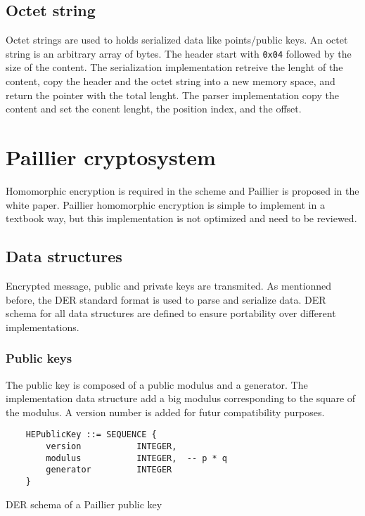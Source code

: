 \subsection{Octet string}

Octet strings are used to holds serialized data like points/public keys.
An octet string is an arbitrary array of bytes. The header start with \texttt{0x04}
followed by the size of the content. The serialization implementation retreive
the lenght of the content, copy the header and the octet string into a new memory
space, and return the pointer with the total lenght. The parser implementation
copy the content and set the conent lenght, the position index, and the offset.


\section{Paillier cryptosystem}

Homomorphic encryption is required in the scheme and Paillier is proposed in the
white paper. Paillier homomorphic encryption is simple to implement in a textbook
way, but this implementation is not optimized and need to be reviewed.

\subsection{Data structures}

Encrypted message, public and private keys are transmited. As mentionned before,
the DER standard format is used to parse and serialize data. DER schema for all
data structures are defined to ensure portability over different implementations.

\subsubsection{Public keys}

The public key is composed of a public modulus and a generator. The implementation
data structure add a big modulus corresponding to the square of the modulus. A
version number is added for futur compatibility purposes.

\begin{listing}
  \begin{verbatim}
    HEPublicKey ::= SEQUENCE {
        version           INTEGER,
        modulus           INTEGER,  -- p * q
        generator         INTEGER
    }
  \end{verbatim}
	\caption{DER schema of a Paillier public key}
	\label{lst:DERSchemaPaillierPub}
\end{listing}

